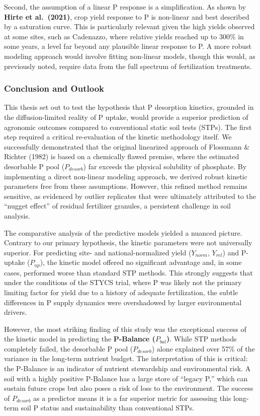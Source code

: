 \documentclass[
  a4paper,
]{article}
\begin{document}
Second, the assumption of a linear P response is a simplification. As
shown by \textbf{Hirte et al.~(2021)}, crop yield response to P is
non-linear and best described by a saturation curve. This is
particularly relevant given the high yields observed at some sites, such
as Cadenazzo, where relative yields reached up to 300\% in some years, a
level far beyond any plausible linear response to P. A more robust
modeling approach would involve fitting non-linear models, though this
would, as previously noted, require data from the full spectrum of
fertilization treatments.

\newpage

\subsubsection{Conclusion and Outlook}\label{conclusion-and-outlook}

This thesis set out to test the hypothesis that P desorption kinetics,
grounded in the diffusion-limited reality of P uptake, would provide a
superior prediction of agronomic outcomes compared to conventional
static soil tests (STPs). The first step required a critical
re-evaluation of the kinetic methodology itself. We successfully
demonstrated that the original linearized approach of Flossmann \&
Richter (1982) is based on a chemically flawed premise, where the
estimated desorbable P pool (\(P_{desorb}\)) far exceeds the physical
solubility of phosphate. By implementing a direct non-linear modeling
approach, we derived robust kinetic parameters free from these
assumptions. However, this refined method remains sensitive, as
evidenced by outlier replicates that were ultimately attributed to the
``nugget effect'' of residual fertilizer granules, a persistent
challenge in soil analysis.

The comparative analysis of the predictive models yielded a nuanced
picture. Contrary to our primary hypothesis, the kinetic parameters were
not universally superior. For predicting site- and national-normalized
yield (\(Y_{norm}\), \(Y_{rel}\)) and P-uptake (\(P_{up}\)), the kinetic
model offered no significant advantage and, in some cases, performed
worse than standard STP methods. This strongly suggests that under the
conditions of the STYCS trial, where P was likely not the primary
limiting factor for yield due to a history of adequate fertilization,
the subtle differences in P supply dynamics were overshadowed by larger
environmental drivers.

However, the most striking finding of this study was the exceptional
success of the kinetic model in predicting the \textbf{P-Balance
(\(P_{bal}\))}. While STP methods completely failed, the desorbable P
pool (\(P_{desorb}\)) alone explained over 57\% of the variance in the
long-term nutrient budget. The interpretation of this is critical: the
P-Balance is an indicator of nutrient stewardship and environmental
risk. A soil with a highly positive P-Balance has a large store of
``legacy P,'' which can sustain future crops but also poses a risk of
loss to the environment. The success of \(P_{desorb}\) as a predictor
means it is a far superior metric for assessing this long-term soil P
status and sustainability than conventional STPs.
\end{document}
